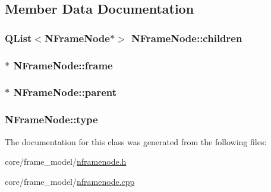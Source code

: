 \subsection{Member Data Documentation}
\hypertarget{class_n_frame_node_a999f2dc424e2a11c2818a95df03a26c5}{
\subsubsection[{children}]{\setlength{\rightskip}{0pt plus 5cm}QList$<${\bf NFrameNode}$\ast$$>$ {\bf NFrameNode::children}}}
\label{class_n_frame_node_a999f2dc424e2a11c2818a95df03a26c5}
\hypertarget{class_n_frame_node_a8f3e3eaa1c2ae6cb7be00ea2444fd098}{
\subsubsection[{frame}]{$\ast$ {\bf NFrameNode::frame}}}
\label{class_n_frame_node_a8f3e3eaa1c2ae6cb7be00ea2444fd098}
\hypertarget{class_n_frame_node_ab2675b008092b16312265051255ac6d8}{
\subsubsection[{parent}]{$\ast$ {\bf NFrameNode::parent}}}
\label{class_n_frame_node_ab2675b008092b16312265051255ac6d8}
\hypertarget{class_n_frame_node_a505e19a5298af41dcd622344bd3875e8}{
\subsubsection[{type}]{ {\bf NFrameNode::type}}}
\label{class_n_frame_node_a505e19a5298af41dcd622344bd3875e8}


The documentation for this class was generated from the following files:\begin{DoxyCompactItemize}
\item 
core/frame\_\-model/\hyperlink{nframenode_8h}{nframenode.h}\item 
core/frame\_\-model/\hyperlink{nframenode_8cpp}{nframenode.cpp}\end{DoxyCompactItemize}
